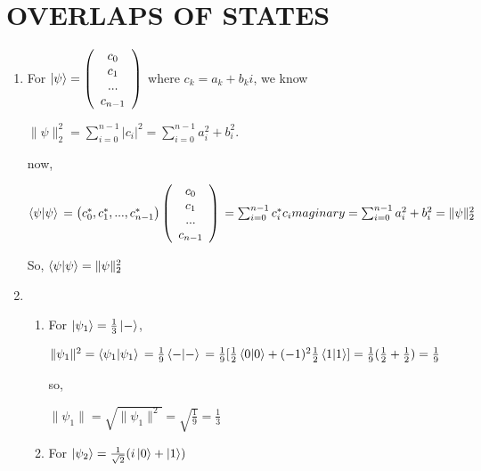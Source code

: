 \documentclass{article}
\begin{document}
\section*{OVERLAPS OF STATES}
\begin{enumerate}
    \item For $\ket{\psi}=\left(\begin{array}{c}
        c_0\\c_1\\...\\c_{n-1}
    \end{array}\right)$
    where $c_k=a_k+b_ki$,
    we know 
    
    $\lVert\psi\rVert^2_2 = \sum_{i=0}^{n-1}|c_i|^2=\sum_{i=0}^{n-1}a_i^2+b_i^2$.

    now,


    $\braket{\psi|\psi}
    \\=\left(c_0^*,c_1^*,...,c_{n-1}^*\right)\left(\begin{array}{c}
        c_0\\c_1\\...\\c_{n-1}
    \end{array}\right)
    \\=\sum_{i=0}^{n-1}c_i^*c_imaginary
    \\=\sum_{i=0}^{n-1}a_i^2+b_i^2
    \\=\lVert\psi\rVert^2_2
    $

    So, $\braket{\psi|\psi}=\lVert\psi\rVert^2_2$
    \item 
    \begin{enumerate}
        \item For $\ket{\psi_1}=\frac{1}{3}\ket{-}$,
        
        $\lVert\psi_1\rVert^2
        \\=\braket{\psi_1|\psi_1}
        \\=\frac{1}{9}\braket{-|-}
        \\=\frac{1}{9}[\frac{1}{2}\braket{0|0}+(-1)^2\frac{1}{2}\braket{1|1}]
        \\=\frac{1}{9}(\frac{1}{2}+\frac{1}{2})
        \\=\frac{1}{9}$

        so,

        $\lVert\psi_1\rVert=\sqrt{\lVert\psi_1\rVert^2}=\sqrt{\frac{1}{9}}=\frac{1}{3}$
        
        \item For $\ket{\psi_2}=\frac{1}{\sqrt{2}}(i\ket{0}+\ket{1})$
        

\end{enumerate}
\end{enumerate}
\end{document}
